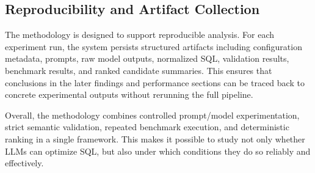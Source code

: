 \subsection{Reproducibility and Artifact Collection}

The methodology is designed to support reproducible analysis. For each experiment run, the system persists structured artifacts including configuration metadata, prompts, raw model outputs, normalized SQL, validation results, benchmark results, and ranked candidate summaries. This ensures that conclusions in the later findings and performance sections can be traced back to concrete experimental outputs without rerunning the full pipeline.

Overall, the methodology combines controlled prompt/model experimentation, strict semantic validation, repeated benchmark execution, and deterministic ranking in a single framework. This makes it possible to study not only whether LLMs can optimize SQL, but also under which conditions they do so reliably and effectively.
